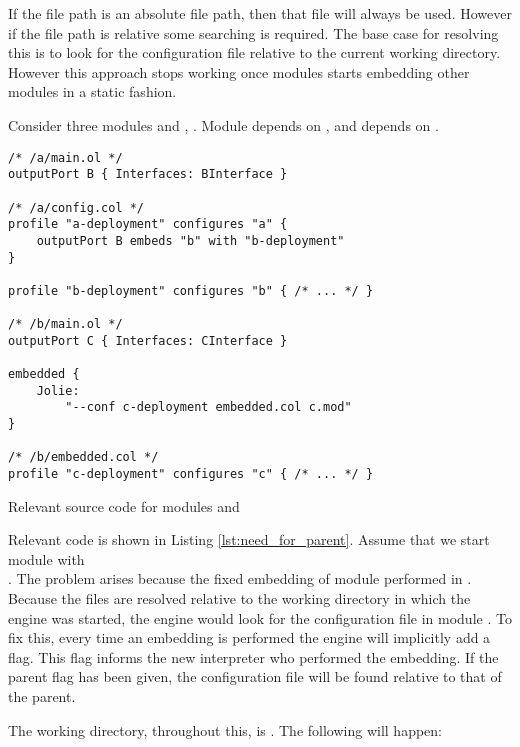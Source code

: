 If the file path is an absolute file path, then that file will always be used.
However if the file path is relative some searching is required. The base case
for resolving this is to look for the configuration file relative to the
current working directory. However this approach stops working once modules starts
embedding other modules in a static fashion.

Consider three modules  and , . Module  depends
on , and  depends on .

\begin{listing}[H]
\begin{verbatim}
/* /a/main.ol */
outputPort B { Interfaces: BInterface }

/* /a/config.col */
profile "a-deployment" configures "a" {
    outputPort B embeds "b" with "b-deployment"
}

profile "b-deployment" configures "b" { /* ... */ }

/* /b/main.ol */
outputPort C { Interfaces: CInterface }

embedded {
    Jolie:
        "--conf c-deployment embedded.col c.mod"
}

/* /b/embedded.col */
profile "c-deployment" configures "c" { /* ... */ }
\end{verbatim}

\caption{Relevant source code for modules  and }

\label{lst:need_for_parent}

\end{listing}

Relevant code is shown in Listing \ref{lst:need_for_parent}.  Assume that we
start module  with \\.  The
problem arises because the fixed embedding of module  performed in
. Because the files are resolved relative to the working directory in
which the engine was started, the engine would look for the configuration file
in module . To fix this, every time an embedding is performed the
engine will implicitly add a  flag. This flag informs the new
interpreter who performed the embedding. If the parent flag has been given, the
configuration file will be found relative to that of the parent.

The working directory, throughout this, is .  The following will
happen:

